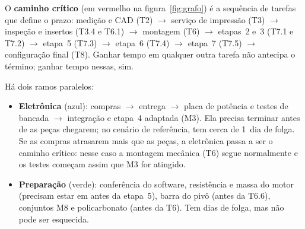 \documentclass[11pt,a4paper]{article}
\newcommand{\arq}[1]{\path{#1}}                    %
\newcommand{\flecha}{\ensuremath{\rightarrow}}
\begin{document}
O \textbf{caminho crítico} (em vermelho na figura~\ref{fig:grafo}) é a sequência de tarefas
que define o prazo: medição e CAD (T2) \flecha{} serviço de impressão (T3) \flecha{} inspeção e
insertos (T3.4 e T6.1) \flecha{} montagem (T6) \flecha{} etapas~2 e~3 (T7.1 e T7.2) \flecha{} etapa~5
(T7.3) \flecha{} etapa~6 (T7.4) \flecha{} etapa~7 (T7.5) \flecha{} configuração final (T8). Ganhar tempo
em qualquer outra tarefa não antecipa o término; ganhar tempo nessas, sim.

Há dois ramos paralelos:
\begin{itemize}
  \item \textbf{Eletrônica} (azul): compras \flecha{} entrega \flecha{} placa de potência e testes de
    bancada \flecha{} integração e etapa~4 adaptada (M3). Ela precisa terminar antes de as peças
    chegarem; no cenário de referência, tem cerca de 1~dia de folga. Se as compras atrasarem
    mais que as peças, a eletrônica passa a ser o caminho crítico: nesse caso a montagem
    mecânica (T6) segue normalmente e os testes começam assim que M3 for atingido.
  \item \textbf{Preparação} (verde): conferência do software, resistência e massa do motor
    (precisam estar em \arq{sim/params.py} antes da etapa~5), barra do pivô (antes da T6.6),
    conjuntos M8 e policarbonato (antes da T6). Tem dias de folga, mas não pode ser
    esquecida.
\end{itemize}
\end{document}
